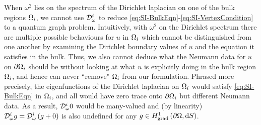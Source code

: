 When $\omega^2$ lies on the spectrum of the Dirichlet laplacian on one of the bulk regions $\Omega_i$, we cannot use $\mathcal{D}^i_{\omega}$ to reduce \eqref{eq:SI-BulkEqn}-\eqref{eq:SI-VertexCondition} to a quantum graph problem.
Intuitively, with $\omega^2$ on the Dirichlet spectrum there are multiple possible behaviours for $u$ in $\Omega_i$ which cannot be distinguished from one another by examining the Dirichlet boundary values of $u$ and the equation it satisfies in the bulk.
Thus, we also cannot deduce what the Neumann data for $u$ on $\partial\Omega_i$ should be without looking at what $u$ is explicitly doing in the bulk region $\Omega_i$, and hence can never ``remove" $\Omega_i$ from our formulation.
Phrased more precisely, the eigenfunctions of the Dirichlet laplacian on $\Omega_i$ would satisfy \eqref{eq:SI-BulkEqn} in $\Omega_i$, and all would have zero trace onto $\partial\Omega_i$ but different Neumann data.
As a result, $\mathcal{D}^i_\omega 0$ would be many-valued and (by linearity) $\mathcal{D}^i_\omega g = \mathcal{D}^i_\omega\left( g+0 \right)$ is also undefined for any $g\in H^1_\mathrm{grad}\left( \partial\Omega, \mathrm{d}S \right)$.

